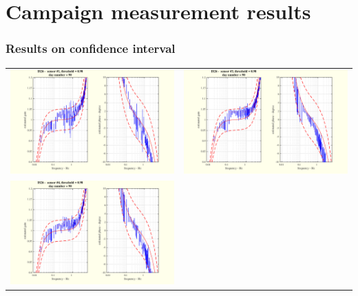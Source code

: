 \documentclass[handout,10pt]{beamer}
\begin{document}
\section{Campaign measurement results}
\begin{frame}
\frametitle{Results on confidence interval}
\begin{tabular}{cc}
\includegraphics[scale=0.25]{3monthsonIS26SUTboxplot1-eps-converted-to.pdf}
&
\includegraphics[scale=0.25]{3monthsonIS26SUTboxplot3-eps-converted-to.pdf}
\\
\includegraphics[scale=0.25]{3monthsonIS26SUTboxplot4-eps-converted-to.pdf}

\end{tabular}
\end{frame}
\end{document}
